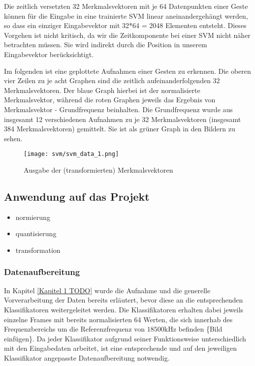 Die zeitlich versetzten 32 Merkmalsvektoren mit je 64 Datenpunkten einer Geste können für die Eingabe in eine trainierte SVM linear aneinandergehängt werden, so dass ein einziger Eingabevektor mit 32*64 = 2048 Elementen entsteht. 
Dieses Vorgehen ist nicht kritisch, da wir die Zeitkomponente bei einer SVM nicht näher betrachten müssen. 
Sie wird indirekt durch die Position in unserem Eingabevektor berücksichtigt.

Im folgenden ist eine geplottete Aufnahmen einer Gesten zu erkennen. 
Die oberen vier Zeilen zu je acht Graphen sind die zeitlich aufeinanderfolgenden 32 Merkmalsvektoren. 
Der blaue Graph hierbei ist der normalisierte Merkmalsvektor, während die roten Graphen jeweils das Ergebnis von Merkmalsvektor - Grundfrequenz beinhalten. 
Die Grundfrequenz wurde aus insgesamt 12 verschiedenen Aufnahmen zu je 32 Merkmalsvektoren (insgesamt 384 Merkmalsvektoren) gemittelt. 
Sie ist als grüner Graph in den Bildern zu sehen.

\begin{figure}[h!]
  \centering
    \texttt{[image: svm/svm\_data\_1.png]}
  \caption{Ausgabe der (transformierten) Merkmalsvektoren}
\end{figure}


\newpage 
\subsection{Anwendung auf das Projekt}
\begin{itemize}
\item{normierung}
\item{quantisierung}
\item{transformation}
\end{itemize}


\subsubsection{Datenaufbereitung}
In Kapitel \ref{Kapitel 1 TODO} wurde die Aufnahme und die generelle Vorverarbeitung der Daten bereits erläutert, bevor diese an die entsprechenden Klassifikatoren weitergeleitet werden.
Die Klassifikatoren erhalten dabei jeweils einzelne Frames mit bereits normalisierten 64 Werten, die sich innerhab des Frequenzbereichs um die Referenzfrequenz von $18500\text{kHz}$ befinden  \{Bild einfügen\}. 
Da jeder Klassifikator aufgrund seiner Funktionsweise unterschiedlich mit den Eingabedaten arbeitet, ist eine entsprechende und auf den jeweiligen Klassifikator angepasste Datenaufbereitung notwendig.

